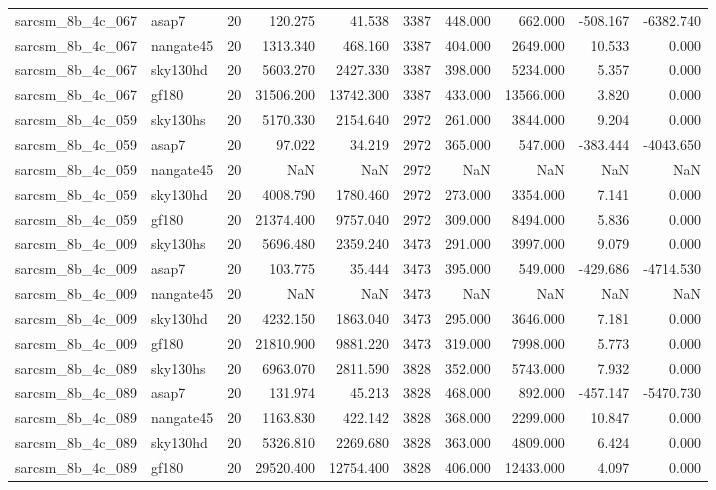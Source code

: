\begin{tabular}{llrrrrrrrr}
sarcsm\_8b\_4c\_067 & asap7 & 20 & 120.275 & 41.538 & 3387 & 448.000 & 662.000 & -508.167 & -6382.740 \\
sarcsm\_8b\_4c\_067 & nangate45 & 20 & 1313.340 & 468.160 & 3387 & 404.000 & 2649.000 & 10.533 & 0.000 \\
sarcsm\_8b\_4c\_067 & sky130hd & 20 & 5603.270 & 2427.330 & 3387 & 398.000 & 5234.000 & 5.357 & 0.000 \\
sarcsm\_8b\_4c\_067 & gf180 & 20 & 31506.200 & 13742.300 & 3387 & 433.000 & 13566.000 & 3.820 & 0.000 \\
sarcsm\_8b\_4c\_059 & sky130hs & 20 & 5170.330 & 2154.640 & 2972 & 261.000 & 3844.000 & 9.204 & 0.000 \\
sarcsm\_8b\_4c\_059 & asap7 & 20 & 97.022 & 34.219 & 2972 & 365.000 & 547.000 & -383.444 & -4043.650 \\
sarcsm\_8b\_4c\_059 & nangate45 & 20 & NaN & NaN & 2972 & NaN & NaN & NaN & NaN \\
sarcsm\_8b\_4c\_059 & sky130hd & 20 & 4008.790 & 1780.460 & 2972 & 273.000 & 3354.000 & 7.141 & 0.000 \\
sarcsm\_8b\_4c\_059 & gf180 & 20 & 21374.400 & 9757.040 & 2972 & 309.000 & 8494.000 & 5.836 & 0.000 \\
sarcsm\_8b\_4c\_009 & sky130hs & 20 & 5696.480 & 2359.240 & 3473 & 291.000 & 3997.000 & 9.079 & 0.000 \\
sarcsm\_8b\_4c\_009 & asap7 & 20 & 103.775 & 35.444 & 3473 & 395.000 & 549.000 & -429.686 & -4714.530 \\
sarcsm\_8b\_4c\_009 & nangate45 & 20 & NaN & NaN & 3473 & NaN & NaN & NaN & NaN \\
sarcsm\_8b\_4c\_009 & sky130hd & 20 & 4232.150 & 1863.040 & 3473 & 295.000 & 3646.000 & 7.181 & 0.000 \\
sarcsm\_8b\_4c\_009 & gf180 & 20 & 21810.900 & 9881.220 & 3473 & 319.000 & 7998.000 & 5.773 & 0.000 \\
sarcsm\_8b\_4c\_089 & sky130hs & 20 & 6963.070 & 2811.590 & 3828 & 352.000 & 5743.000 & 7.932 & 0.000 \\
sarcsm\_8b\_4c\_089 & asap7 & 20 & 131.974 & 45.213 & 3828 & 468.000 & 892.000 & -457.147 & -5470.730 \\
sarcsm\_8b\_4c\_089 & nangate45 & 20 & 1163.830 & 422.142 & 3828 & 368.000 & 2299.000 & 10.847 & 0.000 \\
sarcsm\_8b\_4c\_089 & sky130hd & 20 & 5326.810 & 2269.680 & 3828 & 363.000 & 4809.000 & 6.424 & 0.000 \\
sarcsm\_8b\_4c\_089 & gf180 & 20 & 29520.400 & 12754.400 & 3828 & 406.000 & 12433.000 & 4.097 & 0.000 \\

\end{tabular}

